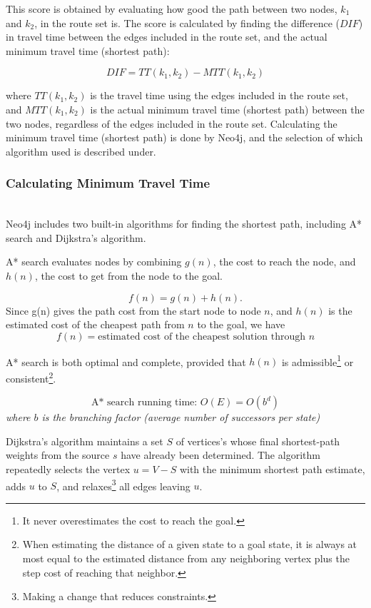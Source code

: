 This score is obtained by evaluating how good the path between two nodes, $k_1$ and $k_2$, in the route set is. The score is calculated by finding the difference ($DIF$) in travel time between the edges included in the route set, and the actual minimum travel time (shortest path):

$$ DIF = TT(k_{1},k_{2}) - MTT(k_{1},k_{2})$$

where $ TT(k_{1},k_{2})$ is the travel time using the edges included in the route set, and $ MTT(k_{1},k_{2})$ is the actual minimum travel time (shortest path) between the two nodes, regardless of the edges included in the route set. Calculating the minimum travel time (shortest path) is done by Neo4j, and the selection of which algorithm used is described under.

\subsubsection{Calculating Minimum Travel Time}\mbox{}\\ 

Neo4j includes two built-in algorithms for finding the shortest path, including A* search\citep{russel10}  and Dijkstra's algorithm\citep{cormen09}. 

A* search\cite[p.93-94]{russel10} evaluates nodes by combining $g(n)$, the cost to reach the node, and $h(n)$, the cost to get from the node to the goal.

$$ f(n) = g(n) + h(n).$$
Since g(n) gives the path cost from the start node to node $n$, and $h(n)$ is the estimated cost of the cheapest path from $n$ to the goal, we have
$$f(n) = \text{estimated cost of the cheapest solution through $n$} $$ 

A* search is both optimal and complete, provided that $h(n)$ is admissible\footnote{It never overestimates the cost to reach the goal.} or consistent\footnote{When estimating the distance of a given state to a goal state, it is always at most equal to the estimated distance from any neighboring vertex plus the step cost of reaching that neighbor.}. 

$$ \text{A* search running time: } O(E) = O(b^d)$$
\textit{where $b$ is the branching factor (average number of successors per state)}

Dijkstra's algorithm \cite[p.658-662]{cormen09} maintains a set $S$ of vertices's whose final shortest-path weights from the source $s$ have already been determined. The algorithm repeatedly selects the vertex $u = V - S$ with the minimum shortest path estimate, adds $u$ to $S$, and relaxes\footnote{Making a change that reduces constraints.} all edges leaving $u$.

